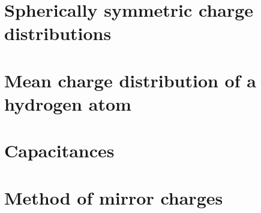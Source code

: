 \documentclass[11pt,letter, swedish, english
]{article}
\renewcommand{\thesubsection}{\arabic{section} (\alph{subsection})}
\begin{document}
\section{Spherically symmetric charge distributions}
\renewcommand{\thesubsection}{\arabic{section} (\roman{subsection})}


\section{Mean charge distribution of a hydrogen atom}
\renewcommand{\thesubsection}{\arabic{section} (\alph{subsection})}


\section{Capacitances}



\section{Method of mirror charges}
\end{document}
